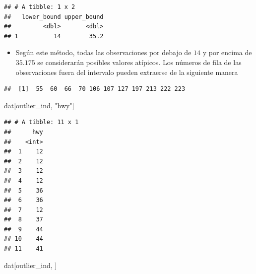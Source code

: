 \documentclass[
]{book}
\newenvironment{Shaded}{\begin{snugshade}}{\end{snugshade}}
\newcommand{\AttributeTok}[1]{\textcolor[rgb]{0.13,0.29,0.53}{#1}}
\newcommand{\FunctionTok}[1]{\textcolor[rgb]{0.13,0.29,0.53}{\textbf{#1}}}
\newcommand{\NormalTok}[1]{#1}
\newcommand{\OtherTok}[1]{\textcolor[rgb]{0.56,0.35,0.01}{#1}}
\newcommand{\SpecialCharTok}[1]{\textcolor[rgb]{0.81,0.36,0.00}{\textbf{#1}}}
\newcommand{\StringTok}[1]{\textcolor[rgb]{0.31,0.60,0.02}{#1}}
\providecommand{\tightlist}{%
  \setlength{\itemsep}{0pt}\setlength{\parskip}{0pt}}
\begin{document}
\begin{verbatim}
## # A tibble: 1 x 2
##   lower_bound upper_bound
##         <dbl>       <dbl>
## 1          14        35.2
\end{verbatim}

\begin{itemize}
\tightlist
\item
  Según este método, todas las observaciones por debajo de \(14\) y por encima de \(35.175\) se considerarán posibles valores atípicos. Los números de fila de las observaciones fuera del intervalo pueden extraerse de la siguiente manera
\end{itemize}

\begin{Shaded}
\end{Shaded}

\begin{verbatim}
##  [1]  55  60  66  70 106 107 127 197 213 222 223
\end{verbatim}

\begin{Shaded}
\begin{Highlighting}[]
\NormalTok{dat[outlier\_ind, }\StringTok{"hwy"}\NormalTok{]}
\end{Highlighting}
\end{Shaded}

\begin{verbatim}
## # A tibble: 11 x 1
##      hwy
##    <int>
##  1    12
##  2    12
##  3    12
##  4    12
##  5    36
##  6    36
##  7    12
##  8    37
##  9    44
## 10    44
## 11    41
\end{verbatim}

\begin{Shaded}
\begin{Highlighting}[]
\NormalTok{dat[outlier\_ind, ]}
\end{Highlighting}
\end{Shaded}
\end{document}
